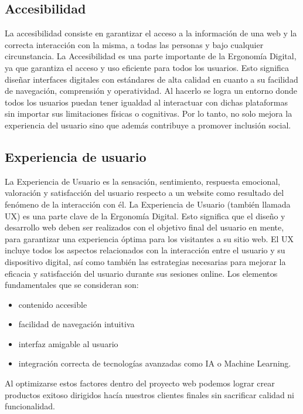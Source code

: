 \documentclass[12pt]{article}
\begin{document}
\subsection*{Accesibilidad}
La accesibilidad consiste en garantizar el acceso a la información de una web y la correcta interacción con la misma, a todas las personas y bajo cualquier circunstancia.
La Accesibilidad es una parte importante de la Ergonomía Digital, ya que garantiza el acceso y uso eficiente para todos los usuarios. Esto significa diseñar interfaces digitales con estándares de alta calidad en cuanto a su facilidad de navegación, comprensión y operatividad. Al hacerlo se logra un entorno donde todos los usuarios puedan tener igualdad al interactuar con dichas plataformas sin importar sus limitaciones físicas o cognitivas. Por lo tanto, no solo mejora la experiencia del usuario sino que además contribuye a promover inclusión social.

\subsection*{Experiencia de usuario}
La Experiencia de Usuario es la sensación, sentimiento, respuesta emocional, valoración y satisfacción del usuario respecto a un
website como resultado del fenómeno de la interacción con él.
La Experiencia de Usuario (también llamada UX) es una parte clave de la Ergonomía Digital. Esto significa que el diseño y desarrollo web deben ser realizados con el objetivo final del usuario en mente, para garantizar una experiencia óptima para los visitantes a su sitio web. El UX incluye todos los aspectos relacionados con la interacción entre el usuario y su dispositivo digital, así como también las estrategias necesarias para mejorar la eficacia y satisfacción del usuario durante sus sesiones online.
Los elementos fundamentales que se consideran son:

\begin{itemize}
    \item contenido accesible
    \item facilidad de navegación intuitiva
    \item interfaz amigable al usuario
    \item integración correcta de tecnologías avanzadas como IA o Machine Learning.
\end{itemize}
Al optimizarse estos factores dentro del proyecto web podemos lograr crear productos exitoso dirigidos hacía nuestros clientes finales sin sacrificar calidad ni funcionalidad.
\end{document}
